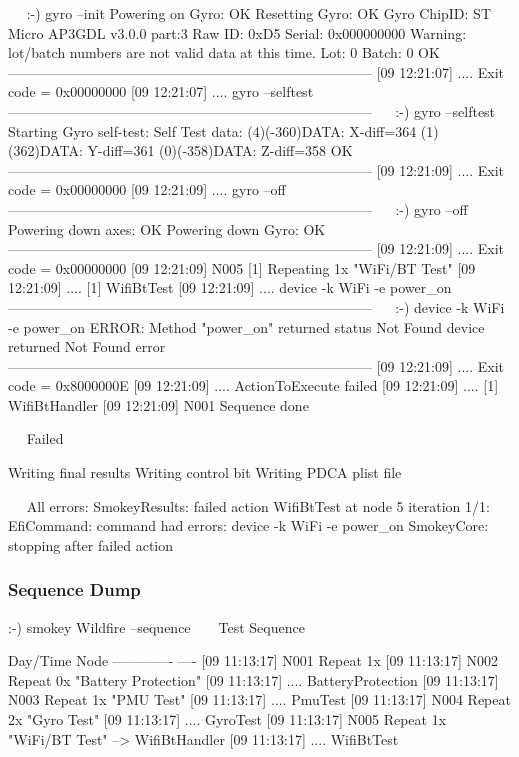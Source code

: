 \documentclass[11pt]{article}
\newlength{\ElideShift}
\newcommand{\elide}{%
		\makebox[0in][l]{%
			\setlength{\ElideShift}{-5.2pt}%
			\addtolength{\ElideShift}{-2em}%
			\hspace{\ElideShift}%
			\begin{tikzpicture}[%
				every path/.style={%
					decoration={%
						complete sines,%
						segment length=2em,%
						amplitude=0.5ex%
						},%
					decorate%
					}%
				]%
				\draw[color=white, yshift=0.475ex, line width=0.575ex] (-2em-0.5pt,0) -- (\linewidth+6.7pt+2em,0);%
				\draw[color=SmokeyDarkBlue, yshift=0.85ex] (0,0) -- (\linewidth+6.7pt,0);%
				\draw[color=SmokeyDarkBlue, yshift=0.15ex] (0,0) -- (\linewidth+6.7pt,0);%
			\end{tikzpicture}%
			}%
		}%
\renewcommand{\mp}[1]{%
		\makebox[0in][r]{%
			\color{SmokeyDarkBlue}%
			\raisebox{0in}[0in][0in]{%
				\fbox{%
					\normalfont\bfseries\scriptsize##1%
					}%
				}%
			\rule[0.5ex]{2em}{\fboxrule}%
			\hspace{3pt}%
			}%
		}%
\begin{document}
\begin{AnnotedLogFile}
~\mp{Diags Command}~:-) gyro --init
Powering on Gyro: OK
Resetting Gyro: OK
Gyro ChipID: ST Micro AP3GDL v3.0.0 part:3
Raw ID: 0xD5
Serial: 0x000000000
Warning: lot/batch numbers are not valid data at this time.
Lot: 0 Batch: 0
OK
------------------------------------------------------------------------------
[09 12:21:07] .... 			Exit code = 0x00000000
[09 12:21:07] .... 			gyro --selftest
------------------------------------------------------------------------------
~\mp{Diags Command}~:-) gyro --selftest
Starting Gyro self-test:
Self Test data:
(4)(-360)DATA: X-diff=364
(1)(362)DATA: Y-diff=361
(0)(-358)DATA: Z-diff=358
OK
------------------------------------------------------------------------------
[09 12:21:09] .... 			Exit code = 0x00000000
[09 12:21:09] .... 			gyro --off
------------------------------------------------------------------------------
~\mp{Diags Command}~:-) gyro --off
Powering down axes: OK
Powering down Gyro: OK
------------------------------------------------------------------------------
[09 12:21:09] .... 			Exit code = 0x00000000
[09 12:21:09] N005 	[1] Repeating 1x "WiFi/BT Test"
[09 12:21:09] .... 		[1] WifiBtTest
[09 12:21:09] .... 			device -k WiFi -e power_on
------------------------------------------------------------------------------
~\mp{Diags Command}~:-) device -k WiFi -e power_on
ERROR: Method "power_on" returned status Not Found
device returned Not Found error
------------------------------------------------------------------------------
[09 12:21:09] .... 			Exit code = 0x8000000E
[09 12:21:09] .... 			ActionToExecute failed
[09 12:21:09] .... 		[1] WifiBtHandler
[09 12:21:09] N001 Sequence done

~\mp{7. Post-flight}~Failed

Writing final results
Writing control bit
Writing PDCA plist file

~\mp{8. Error Summary}~All errors:
	SmokeyResults: failed action WifiBtTest at node 5 iteration 1/1: EfiCommand: command had errors: device -k WiFi -e power_on
	SmokeyCore: stopping after failed action
\end{AnnotedLogFile}

\subsubsection{Sequence Dump}

\begin{LogExcerpt}
:-) smokey Wildfire --sequence
~\elide~
Test Sequence

Day/Time      Node
------------- ----
[09 11:13:17] N001 Repeat 1x
[09 11:13:17] N002      Repeat 0x "Battery Protection"
[09 11:13:17] ....              BatteryProtection
[09 11:13:17] N003      Repeat 1x "PMU Test"
[09 11:13:17] ....              PmuTest
[09 11:13:17] N004      Repeat 2x "Gyro Test"
[09 11:13:17] ....              GyroTest
[09 11:13:17] N005      Repeat 1x "WiFi/BT Test" --> WifiBtHandler
[09 11:13:17] ....              WifiBtTest
\end{LogExcerpt}
\end{document}
